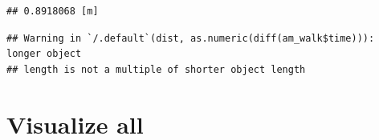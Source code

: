 \documentclass[
]{book}
\newenvironment{Shaded}{\begin{snugshade}}{\end{snugshade}}
\newcommand{\FloatTok}[1]{\textcolor[rgb]{0.00,0.00,0.81}{#1}}
\newcommand{\FunctionTok}[1]{\textcolor[rgb]{0.13,0.29,0.53}{\textbf{#1}}}
\newcommand{\NormalTok}[1]{#1}
\newcommand{\OtherTok}[1]{\textcolor[rgb]{0.56,0.35,0.01}{#1}}
\newcommand{\SpecialCharTok}[1]{\textcolor[rgb]{0.81,0.36,0.00}{\textbf{#1}}}
\begin{document}
\begin{verbatim}
## 0.8918068 [m]
\end{verbatim}

\begin{Shaded}
\end{Shaded}

\begin{verbatim}
## Warning in `/.default`(dist, as.numeric(diff(am_walk$time))): longer object
## length is not a multiple of shorter object length
\end{verbatim}

\hypertarget{visualize-all}{%
\section{Visualize all}\label{visualize-all}}
\end{document}
